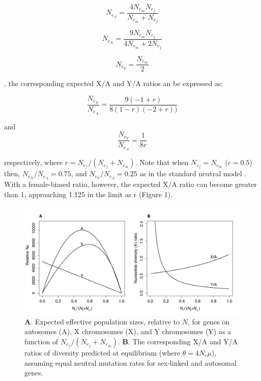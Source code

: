 \documentclass[9pt,twocolumn,twoside]{gsajnl}
\begin{document}
\begin{equation}
N_{e_{A}} = \frac{4N_{e}_{m}N_{e}_{f}}{N_{e}_{m}+N_{e}_{f}} \label{eq:NeA}
\end{equation}

\begin{equation}
N_{e_{X}} = \frac{9N_{e}_{m}N_{e}_{f}}{4N_{e}_{m}+2N_{e}_{f}} \label{eq:NeX}
\end{equation}

\begin{equation}
N_{e_{Y}} = \frac{N_{e}_{m}}{2} \label{eq:NeY}
\end{equation}

\citep{wright1931evolution}, the corresponding expected X/A and Y/A ratios an be expressed as:

\begin{equation}
\frac{N_{e_{X}}}{N_{e_{A}}} = \frac{9 (-1 + r)}{8 (1 - r) (-2 + r))} \label{eq:XA}
\end{equation}

and
\begin{equation}
\frac{N_{e_{Y}}}{N_{e_{A}}} = \frac{1}{8r} \label{eq:YA}
\end{equation}

respectively, where $r = N_{e}_{f}/(N_{e}_{f} + N_{e}_{m})$.  Note that when $N_{e}_{f} = N_{e}_{m}$ ($r=0.5$) then, $N_{e_{X}}/N_{e_{A}} = 0.75$, and $N_{e_{Y}}/N_{e_{A}} = 0.25$ as in the standard neutral model \citep{wright1931evolution}. With a female-biased ratio, however, the expected X/A ratio can become greater than 1, approaching 1.125 in the limit as r \citep{caballero1995} (Figure 1).

\begin{figure}[htbp]
\centering
\noindent
\includegraphics[width=\linewidth]{figure1.jpg}
\caption{\textbf{A}. Expected effective population sizes, relative to $N$,  for genes on autosomes (A), X chromosomes (X), and Y chromosomes (Y) as a function of $N_{e}_{f}/(N_{e}_{f} + N_{e}_{m})$. \textbf{B}. The corresponding X/A and Y/A ratios of diversity predicted at equilibrium (where $\theta=4N_{e}\mu$), assuming equal neutral mutation rates for sex-linked and autosomal genes.
}
\end{figure}
\end{document}
